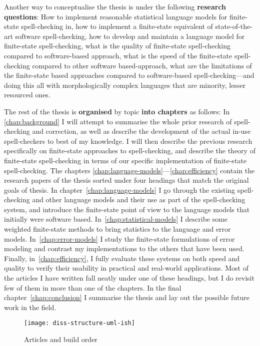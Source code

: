 \documentclass[officiallayout,draft]{unihelcompling}
\begin{document}
Another way to conceptualise the thesis is under the following \textbf{research
questions}: How to implement reasonable statistical language models for
finite-state spell-checking in, how to implement a finite-state equivalent of
state-of-the-art software spell-checking, how to develop and maintain a
language model for finite-state spell-checking, what is the quality of
finite-state spell-checking compared to software-based approach, what is the
speed of the finite-state spell-checking compared to other software
based-approach, what are the limitations of the finite-state based approaches
compared to software-based spell-checking---and doing this all with
morphologically complex languages that are minority, lesser resourced ones.

The rest of the thesis is \textbf{organised} by topic \textbf{into chapters} as
follows: In \ref{chap:background} I will attempt to summarise the whole prior
research of spell-checking and correction, as well as describe the development
of the actual in-use spell-checkers to best of my knowledge. I will then
describe the previous research specifically on finite-state approaches to
spell-checking, and describe the theory of finite-state spell-checking in terms
of our specific implementation of finite-state spell-checking. The chapters
\ref{chap:language-models}---\ref{chap:efficiency} contain the research papers
of the thesis sorted under four headings that match the original goals of
thesis.  In chapter~\ref{chap:language-models} I go through the existing
spell-checking and other language models and their use as part of the
spell-checking system, and introduce the finite-state point of view to the
language models that initially were software based.
In~\ref{chap:statistical-models} I describe some weighted finite-state methods
to bring statistics to the language and error models.
In~\ref{chap:error-models} I study the finite-state formulations of error
modeling and contrast my implementations to the others that have been used.
Finally, in~\ref{chap:efficiency}, I fully evaluate these systems on both speed
and quality to verify their usability in practical and real-world applications.
Most of the articles I have written fall neatly under one of these headings,
but I do revisit few of them in more than one of the chapters. In the final
chapter~\ref{chap:conclusion} I summarise the thesis and lay out the possible
future work in the field.

\begin{figure}
    \texttt{[image: diss-structure-uml-ish]}
    \caption{Articles and build order
    \label{fig:schematic-diagram}}
\end{figure}
\end{document}

